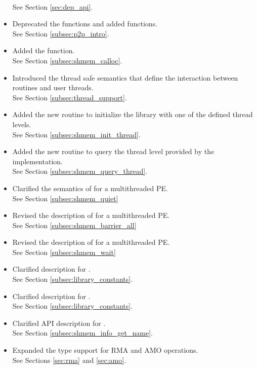 \begin{itemize}
\\See Section \ref{sec:dep_api}.
%
\item Deprecated the  functions and added 
      functions.
\\ See Section \ref{subsec:p2p_intro}.
%
\item Added the  function.
\\ See Section \ref{subsec:shmem_calloc}.
%
\item Introduced the thread safe semantics that define the interaction between
    \openshmem routines and user threads.
\\See Section \ref{subsec:thread_support}.
%
\item Added the new routine  to initialize the
    \openshmem library with one of the defined thread levels.
\\See Section \ref{subsec:shmem_init_thread}.
%
\item Added the new routine  to query the thread
    level provided by the \openshmem implementation.
\\See Section \ref{subsec:shmem_query_thread}.
%
\item Clarified the semantics of  for a multithreaded
    \openshmem \ac{PE}.
\\See Section \ref{subsec:shmem_quiet}
%
\item Revised the description of  for a multithreaded
    \openshmem \ac{PE}.
\\See Section \ref{subsec:shmem_barrier_all}
%
\item Revised the description of  for a multithreaded
    \openshmem \ac{PE}.
\\See Section \ref{subsec:shmem_wait}
%
\item Clarified description for .
\\See Section \ref{subsec:library_constants}.
%
\item Clarified description for .
\\See Section \ref{subsec:library_constants}.
%
\item Clarified API description for .
\\See Section \ref{subsec:shmem_info_get_name}.
%
\item Expanded the type support for RMA and AMO operations.
\\ See Sections \ref{sec:rma} and \ref{sec:amo}.

\end{itemize}
